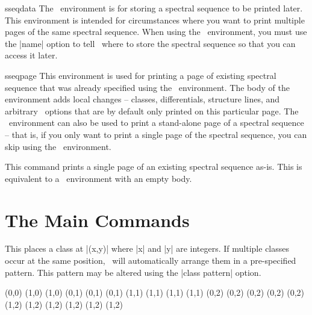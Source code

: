 \begin{sseqdata}[|| name = ex1, cohomological Serre grading]
\begin{environment}{{sseqdata}\moptions}
The \sseqdataenv\  environment is for storing a spectral sequence to be printed later. This environment is intended for circumstances where you want to print multiple pages of the same spectral sequence. When using the \sseqdataenv\  environment, you must use the |name| option to tell \sseqpages\  where to store the spectral sequence so that you can access it later.
\end{environment}

\begin{environment}{{sseqpage}\ooptions}
This environment is used for printing a page of existing spectral sequence that was already specified using the \sseqdataenv\  environment. The body of the environment adds local changes -- classes, differentials, structure lines, and arbitrary \tikzpkg\  options that are by default only printed on this particular page. The \sseqpageenv\  environment can also be used to print a stand-alone page of a spectral sequence -- that is, if you only want to print a single page of the spectral sequence, you can skip using the \sseqdataenv\  environment.
\end{environment}

\begin{command}{\printpage\moptions}
This command prints a single page of an existing spectral sequence as-is. This is equivalent to a \sseqpageenv\  environment with an empty body.
\end{command}


\section{The Main Commands}
\begin{command}{\class\ooptions{}}
This places a class at |(x,y)| where |x| and |y| are integers. If multiple classes occur at the same position, \sseqpages\  will automatically arrange them in a pre-specified pattern. This pattern may be altered using the |class pattern| option.
\begin{codeexample}[]
\begin{sseqpage}[ no axes, ymirror, yscale = 0.8 ]
\class(0,0)
\class(1,0) \class(1,0)
\class(0,1) \class(0,1) \class(0,1)
\class(1,1) \class(1,1) \class(1,1) \class(1,1)
\class(0,2) \class(0,2) \class(0,2) \class(0,2) \class(0,2)
\class(1,2) \class(1,2) \class(1,2) \class(1,2) \class(1,2) \class(1,2)
\end{sseqpage}
\end{codeexample}


\end{command}
\end{sseqdata}
